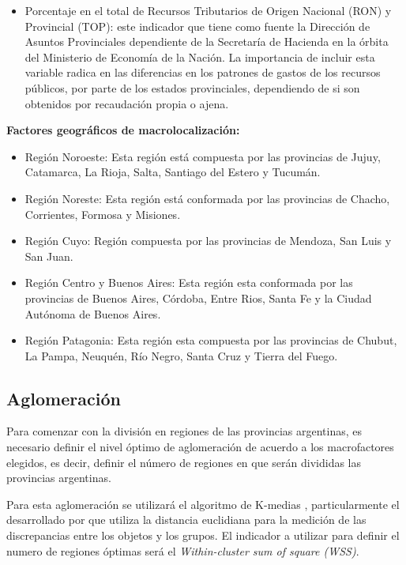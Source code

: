 \documentclass[12pt,a4paper]{article}
\begin{document}
\begin{itemize}
\item Porcentaje en el total de Recursos Tributarios de Origen Nacional (RON) y Provincial (TOP): este indicador que tiene como fuente la Dirección de Asuntos Provinciales dependiente de la Secretaría de Hacienda en la órbita del Ministerio de Economía de la Nación. La importancia de incluir esta variable radica en las diferencias en los patrones de gastos de los recursos públicos, por parte de los estados provinciales, dependiendo de si son obtenidos por recaudación propia o ajena.
\end{itemize}

\textbf{Factores geográficos de macrolocalización:}
\begin{itemize}
\item Región  Noroeste: Esta región está compuesta por las provincias de Jujuy, Catamarca, La Rioja, Salta, Santiago del Estero y Tucumán.
\item Región  Noreste: Esta región está conformada por las provincias de Chacho, Corrientes, Formosa y Misiones.
\item Región Cuyo: Región compuesta por las provincias de Mendoza, San Luis y San Juan.
\item Región Centro y Buenos Aires: Esta región esta conformada por las provincias de Buenos Aires, Córdoba, Entre Rios, Santa Fe y la Ciudad Autónoma de Buenos Aires.
\item Región Patagonia: Esta región esta compuesta por las provincias de Chubut, La Pampa, Neuquén, Río Negro, Santa Cruz y Tierra del Fuego.
\end{itemize}



\subsection{Aglomeración}

Para comenzar con la división en regiones de las provincias argentinas, es necesario definir el nivel óptimo de aglomeración de acuerdo a los macrofactores elegidos, es decir, definir el número de regiones en que serán divididas las provincias argentinas.

Para esta aglomeración se utilizará el algoritmo de K-medias \parencite{macqueen_methods_1967}, particularmente el desarrollado por \textcite{hartigan_k-means_1979} que utiliza la distancia euclidiana para la medición de las discrepancias entre los objetos y los grupos. El indicador a utilizar para definir el numero de regiones óptimas será el \textit{Within-cluster sum of square (WSS)}.
\end{document}
